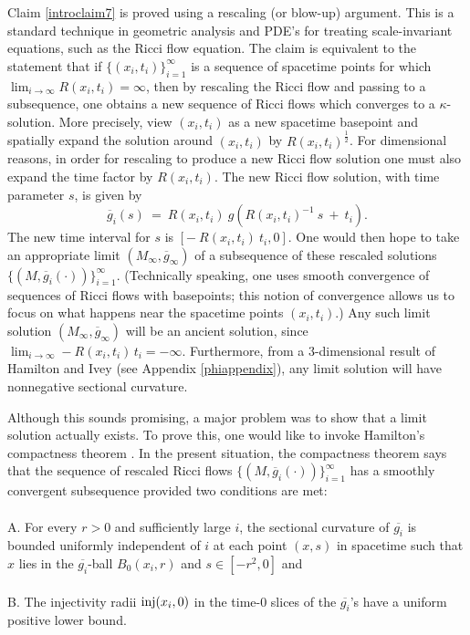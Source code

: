 Claim \ref{introclaim7} is proved using  a rescaling (or blow-up) argument.
This is a standard technique in geometric analysis and PDE's for treating
scale-invariant equations, such as the Ricci flow equation.
The claim is equivalent to the statement
that if $\{(x_i, t_i)\}_{i=1}^\infty$ is a sequence of spacetime points
for which  $\lim_{i \rightarrow \infty} R(x_i, t_i) = \infty$, then
by rescaling  the Ricci flow and passing to a subsequence, one obtains
a new sequence of Ricci flows which converges to a $\kappa$-solution.
More precisely,
view $(x_i, t_i)$ as a new
spacetime basepoint and spatially expand the solution around $(x_i, t_i)$
by $R(x_i,t_i)^{\frac12}$.  For dimensional reasons,
in order for rescaling to produce a new Ricci flow solution
one must also expand the time factor by $R(x_i,t_i)$. The new
Ricci flow solution, with time parameter $s$, is given by
\begin{equation}
\overline{g}_i(s) \: = \: R(x_i,t_i) \:
g \left( R(x_i,t_i)^{-1}  \: s \: + \: t_i \right).
\end{equation}
The new time interval for $s$ is
$\left[ - \:  R(x_i,t_i) \: t_i,0 \right]$.
One would then hope to take an appropriate limit $(M_\infty,
\overline{g}_\infty)$ of a subsequence of these rescaled solutions
$\{(M,  \overline{g}_i(\cdot))\}_{i=1}^\infty$.
(Technically speaking,
one uses smooth convergence of sequences of Ricci flows with basepoints;
this notion of convergence allows us to focus on what happens near
the spacetime points $(x_i, t_i)$.)
Any such  limit solution $(M_\infty,  \overline{g}_\infty)$ will be an ancient
solution,  since
$\lim_{i \rightarrow \infty} -R(x_i,t_i)\,t_i = -\infty$.
Furthermore, from a $3$-dimensional
result of Hamilton and Ivey (see Appendix \ref{phiappendix}),
any limit solution will have nonnegative sectional
curvature.


Although this sounds promising,
a major  problem was to show that a limit solution
actually exists.
To prove this, one would like to invoke Hamilton's compactness
theorem \cite{Hamiltonnn}.   In the present situation, the
compactness theorem says
that the sequence  of rescaled Ricci flows
$\{(M,  \overline{g}_i(\cdot))\}_{i=1}^\infty$
has a smoothly convergent subsequence provided two conditions are met: \\ \\
\noindent
A. For every $r>0$ and sufficiently large $i$,
the sectional curvature of $\overline{g_i}$ is  bounded uniformly independent of $i$
at each point $(x,s)$ in  spacetime such that $x$ lies in the $\overline{g_i}$-ball
$B_0(x_i,r)$ and $s\in [-r^2,0]$ and \\ \\
\noindent
B.  The  injectivity radii
$\operatorname{inj}(x_i, 0)$ in the time-$0$ slices of the $\overline{g_i}$'s have a
uniform positive lower bound.

